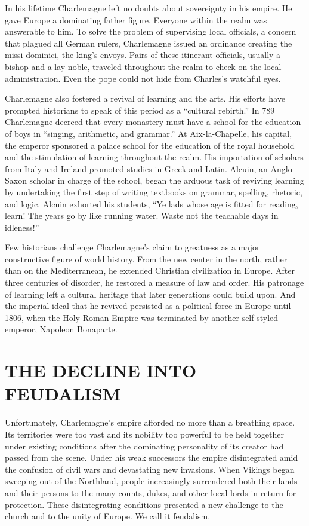 In his lifetime Charlemagne left no doubts about sovereignty in his empire. He gave Europe a
dominating father figure. Everyone within the realm was answerable to him. To solve the problem of
supervising local officials, a concern that plagued all German rulers, Charlemagne issued an
ordinance creating the missi dominici, the king’s envoys. Pairs of these itinerant officials,
usually a bishop and a lay noble, traveled throughout the realm to check on the local
administration. Even the pope could not hide from Charles’s watchful eyes.

Charlemagne also fostered a revival of learning and the arts. His efforts have prompted historians
to speak of this period as a “cultural rebirth.” In 789 Charlemagne decreed that every monastery
must have a school for the education of boys in “singing, arithmetic, and grammar.” At
Aix-la-Chapelle, his capital, the emperor sponsored a palace school for the education of the royal
household and the stimulation of learning throughout the realm. His importation of scholars from
Italy and Ireland promoted studies in Greek and Latin. Alcuin, an Anglo-Saxon scholar in charge of
the school, began the arduous task of reviving learning by undertaking the first step of writing
textbooks on grammar, spelling, rhetoric, and logic. Alcuin exhorted his students, “Ye lads whose
age is fitted for reading, learn! The years go by like running water. Waste not the teachable days
in idleness!”

Few historians challenge Charlemagne’s claim to greatness as a major constructive figure of world
history. From the new center in the north, rather than on the Mediterranean, he extended Christian
civilization in Europe. After three centuries of disorder, he restored a measure of law and order.
His patronage of learning left a cultural heritage that later generations could build upon. And the
imperial ideal that he revived persisted as a political force in Europe until 1806, when the Holy
Roman Empire was terminated by another self-styled emperor, Napoleon Bonaparte.

\section{THE DECLINE INTO FEUDALISM}

Unfortunately, Charlemagne’s empire afforded no more than a breathing space. Its territories were
too vast and its nobility too powerful to be held together under existing conditions after the
dominating personality of its creator had passed from the scene. Under his weak successors the
empire disintegrated amid the confusion of civil wars and devastating new invasions. When Vikings
began sweeping out of the Northland, people increasingly surrendered both their lands and their
persons to the many counts, dukes, and other local lords in return for protection. These
disintegrating conditions presented a new challenge to the church and to the unity of Europe. We
call it feudalism.

